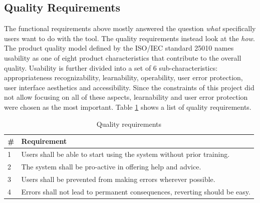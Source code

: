 \subsection{Quality Requirements} \label{sec:quality-requirements}
The functional requirements above mostly answered the question \emph{what} specifically users want to do with the tool. The quality requirements instead look at the \emph{how}. The product quality model defined by the ISO/IEC standard 25010 \cite{_iso/iec_2011} names usability as one of eight product characteristics that contribute to the overall quality. Usability is further divided into a set of 6 sub-characteristics: appropriateness recognizability, learnability, operability, user error protection, user interface aesthetics and accessibility. Since the constraints of this project did not allow focusing on all of these aspects, learnability and user error protection were chosen as the most important. Table \ref{table:quality-requirements} shows a list of quality requirements.

\begin{table}[h!]
\centering
\begin{tabular}{|l|p{12cm}|}
\hline
\rowcolor[HTML]{EFEFEF}
\textbf{\#} & \textbf{Requirement} \\ \hline
1 & Users shall be able to start using the system without prior training. \\ \hline
2 & The system shall be pro-active in offering help and advice. \\ \hline
3 & Users shall be prevented from making errors wherever possible. \\ \hline
4 & Errors shall not lead to permanent consequences, reverting should be easy. \\ \hline
\end{tabular}
\caption{Quality requirements}
\label{table:quality-requirements}
\end{table}





